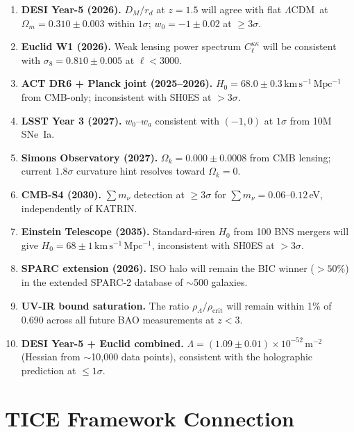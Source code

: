 \documentclass[12pt,a4paper]{article}
\newcommand{\kms}{\,\mathrm{km\,s^{-1}\,Mpc^{-1}}}
\newcommand{\msq}{\,\mathrm{m}^{-2}}
\newcommand{\Omm}{\Omega_m}
\newcommand{\lcdm}{\ensuremath{\Lambda}CDM}
\begin{document}
\begin{enumerate}[leftmargin=*, label=\textbf{P\arabic*.}]

\item \textbf{DESI Year-5 (2026).}
$D_M/r_d$ at $z = 1.5$ will agree with flat \lcdm\ at $\Omm = 0.310 \pm 0.003$
within $1\sigma$; $w_0 = -1 \pm 0.02$ at $\geq 3\sigma$.

\item \textbf{Euclid W1 (2026).}
Weak lensing power spectrum $C_\ell^{\kappa\kappa}$ will be consistent with
$\sigma_8 = 0.810 \pm 0.005$ at $\ell < 3000$.

\item \textbf{ACT DR6 + Planck joint (2025--2026).}
$H_0 = 68.0 \pm 0.3\kms$ from CMB-only; inconsistent with SH0ES at $>3\sigma$.

\item \textbf{LSST Year 3 (2027).}
$w_0$--$w_a$ consistent with $(-1, 0)$ at $1\sigma$ from 10M SNe~Ia.

\item \textbf{Simons Observatory (2027).}
$\Omega_k = 0.000 \pm 0.0008$ from CMB lensing; current $1.8\sigma$ curvature
hint resolves toward $\Omega_k = 0$.

\item \textbf{CMB-S4 (2030).}
$\sum m_\nu$ detection at $\geq 3\sigma$ for $\sum m_\nu = 0.06$--$0.12\,$eV,
independently of KATRIN.

\item \textbf{Einstein Telescope (2035).}
Standard-siren $H_0$ from 100 BNS mergers will give $H_0 = 68 \pm 1\kms$,
inconsistent with SH0ES at $>3\sigma$.

\item \textbf{SPARC extension (2026).}
ISO halo will remain the BIC winner ($>50\%$) in the extended SPARC-2
database of $\sim$500 galaxies.

\item \textbf{UV-IR bound saturation.}
The ratio $\rho_\Lambda/\rho_\mathrm{crit}$ will remain within 1\% of 0.690
across all future BAO measurements at $z < 3$.

\item \textbf{DESI Year-5 + Euclid combined.}
$\Lambda = (1.09 \pm 0.01)\times 10^{-52}\msq$ (Hessian from $\sim$10,000 data points),
consistent with the holographic prediction at $\leq 1\sigma$.
\end{enumerate}

\section{TICE Framework Connection}
\label{sec:tice}
\end{document}
